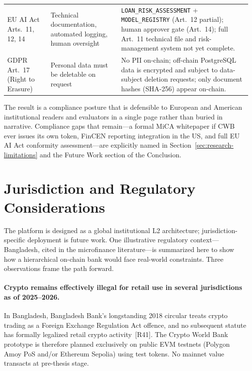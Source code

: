 \documentclass[12pt,a4paper]{report}
\begin{document}
\begin{table}[H]
\begin{tabular}{p{3.2cm}p{4.6cm}p{5.8cm}}
EU AI Act Arts.~11, 12, 14 & Technical documentation, automated logging, human oversight & \texttt{LOAN\_RISK\_ASSESSMENT} + \texttt{MODEL\_REGISTRY} (Art.~12 partial); human approver gate (Art.~14); full Art.~11 technical file and risk-management system not yet complete. \\
GDPR Art.~17 (Right to Erasure) & Personal data must be deletable on request & No PII on-chain; off-chain PostgreSQL data is encrypted and subject to data-subject deletion requests; only document hashes (SHA-256) appear on-chain. \\
\bottomrule
\end{tabular}
\end{table}

The result is a compliance posture that is defensible to European and American institutional readers and evaluators in a single page rather than buried in narrative. Compliance gaps that remain---a formal MiCA whitepaper if CWB ever issues its own token, FinCEN reporting integration in the US, and full EU AI Act conformity assessment---are explicitly named in Section~\ref{sec:research-limitations} and the Future Work section of the Conclusion.

\section{Jurisdiction and Regulatory Considerations}
\label{sec:bangladesh-reg}

The platform is designed as a global institutional L2 architecture; jurisdiction-specific deployment is future work. One illustrative regulatory context---Bangladesh, cited in the microfinance literature---is summarized here to show how a hierarchical on-chain bank would face real-world constraints. Three observations frame the path forward.

\paragraph{Crypto remains effectively illegal for retail use in several jurisdictions as of 2025--2026.}
In Bangladesh, Bangladesh Bank's longstanding 2018 circular treats crypto trading as a Foreign Exchange Regulation Act offence, and no subsequent statute has formally legalized retail crypto activity~[R41]. The Crypto World Bank prototype is therefore planned exclusively on public EVM testnets (Polygon Amoy PoS and/or Ethereum Sepolia) using test tokens. No mainnet value transacts at pre-thesis stage.
\end{document}
